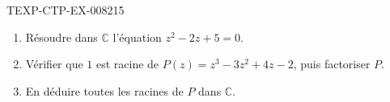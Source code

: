 \begin{exercice}{TEXP-CTP-EX-008}{2}{15}
\begin{enumerate}
  \item Résoudre dans $\mathbb{C}$ l'équation $z^2-2z+5=0$.
  \item Vérifier que $1$ est racine de $P(z)=z^3-3z^2+4z-2$, puis factoriser
        $P$.
  \item En déduire toutes les racines de $P$ dans $\mathbb{C}$.
\end{enumerate}
\end{exercice}
